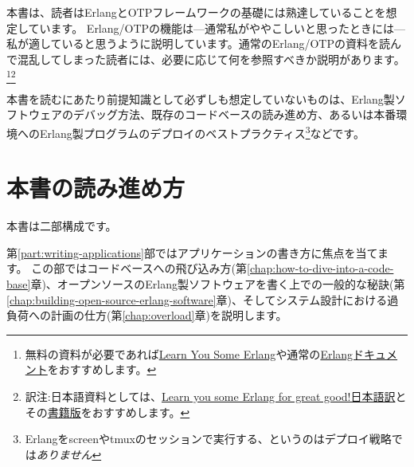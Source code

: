 本書は、読者はErlangとOTPフレームワークの基礎には熟達していることを想定しています。
Erlang/OTPの機能は---通常私がややこしいと思ったときには---私が適していると思うように説明しています。通常のErlang/OTPの資料を読んで混乱してしまった読者には、必要に応じて何を参照すべきか説明があります。\footnote{無料の資料が必要であれば\href{http://learnyousomeerlang.com}{Learn You Some Erlang}や通常の\href{http://www.erlang.org/erldoc}{Erlangドキュメント}をおすすめします。}\footnote{訳注:日本語資料としては、\href{https://www.ymotongpoo.com/works/lyse-ja/}{Learn you some Erlang for great good!日本語訳}とその\href{http://shop.ohmsha.co.jp/shopdetail/000000003873/}{書籍版}をおすすめします。}

本書を読むにあたり前提知識として必ずしも想定していないものは、Erlang製ソフトウェアのデバッグ方法、既存のコードベースの読み進め方、あるいは本番環境へのErlang製プログラムのデプロイのベストプラクティス\footnote{Erlangをscreenやtmuxのセッションで実行する、というのはデプロイ戦略では\emph{ありません}}などです。

\section*{本書の読み進め方}
\label{sec:how-to-read-this-book}

本書は二部構成です。

第\ref{part:writing-applications}部ではアプリケーションの書き方に焦点を当てます。
この部ではコードベースへの飛び込み方(第\ref{chap:how-to-dive-into-a-code-base}章)、オープンソースのErlang製ソフトウェアを書く上での一般的な秘訣(第\ref{chap:building-open-source-erlang-software}章)、そしてシステム設計における過負荷への計画の仕方(第\ref{chap:overload}章)を説明します。

